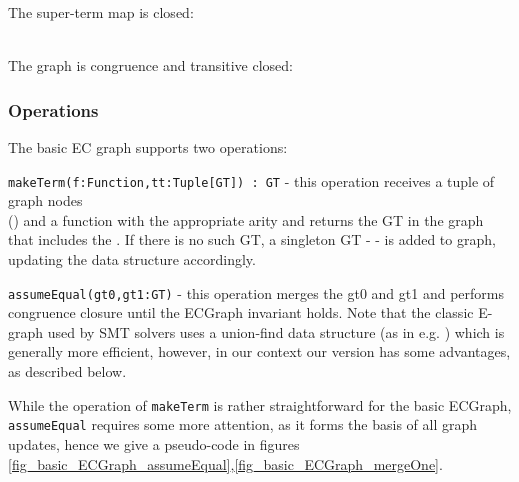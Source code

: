 \noindent
The super-term map is closed:\\
\\

\noindent
The graph is congruence and transitive closed:\\


\subsubsection*{Operations}
The basic EC graph supports two operations:

\bigskip

\noindent
\lstinline|makeTerm(f:Function,tt:Tuple[GT]) : GT| - this operation receives a tuple of graph nodes\\ () and a function with the appropriate arity and returns the GT in the graph that includes the \GFA{} .
If there is no such GT, a singleton GT -  - is added to graph, updating the data structure accordingly.

\bigskip

\noindent
\lstinline|assumeEqual(gt0,gt1:GT)| - this operation merges the \GTs{} gt0 and gt1 and performs congruence closure until the ECGraph invariant holds. Note that the classic E-graph used by SMT solvers uses a union-find data structure (as in e.g. \cite{NelsonOppenUnionFind}) which is generally more efficient, however, in our context our version has some advantages, as described below.

\bigskip

\noindent
While the operation of \lstinline|makeTerm| is rather straightforward for the basic ECGraph, \lstinline|assumeEqual| requires some more attention, as it forms the basis of all graph updates, hence we give a pseudo-code in figures \ref{fig_basic_ECGraph_assumeEqual},\ref{fig_basic_ECGraph_mergeOne}.

